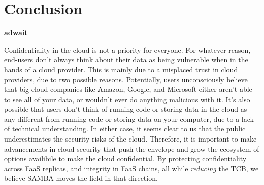 \section{Conclusion}
\label{sec:conclusion}



\textbf{adwait}

Confidentiality in the cloud is not a priority for everyone.
For whatever reason, end-users don't always think about their data as being vulnerable when in the hands of a cloud provider.
This is mainly due to a misplaced trust in cloud providers, due to two possible reasons.
Potentially, users unconsciously believe that big cloud companies like Amazon, Google, and Microsoft either aren't able to see all of your data, or wouldn't ever do anything malicious with it.
It's also possible that users don't think of running code or storing data in the cloud as any different from running code or storing data on your computer, due to a lack of technical understanding.
In either case, it seems clear to us that the public underestimates the security risks of the cloud.
Therefore, it is important to make advancements in cloud security that push the envelope and grow the ecosystem of options availibile to make the cloud confidential.
By protecting confidentiality across FaaS replicas, and integrity in FaaS chains, all while \textit{reducing} the TCB, we believe SAMBA moves the field in that direction.
